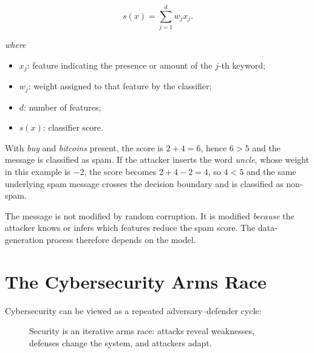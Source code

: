 \documentclass[11pt,a4paper]{report}
\newcommand{\wherelegend}{\par\smallskip\textit{where}\vspace{-0.3em}}
\begin{document}
\begin{equation}
 s(x)=\sum_{j=1}^{d} w_j x_j.
 \label{eq:spam-score}
\end{equation}
\wherelegend
\begin{itemize}
  \item $x_j$: feature indicating the presence or amount of the $j$-th keyword;
  \item $w_j$: weight assigned to that feature by the classifier;
  \item $d$: number of features;
  \item $s(x)$: classifier score.
\end{itemize}

With \emph{buy} and \emph{bitcoins} present, the score is $2+4=6$, hence $6>5$ and the message is classified as spam. If the attacker inserts the word \emph{uncle}, whose weight in this example is $-2$, the score becomes $2+4-2=4$, so $4<5$ and the same underlying spam message crosses the decision boundary and is classified as non-spam.

\begin{examplebox}[title={Adversarial adaptation}]
The message is not modified by random corruption. It is modified \emph{because} the attacker knows or infers which features reduce the spam score. The data-generation process therefore depends on the model.
\end{examplebox}

\section{The Cybersecurity Arms Race}

Cybersecurity can be viewed as a repeated adversary--defender cycle:

\begin{figure}[H]
\centering
{}
\caption{Security is an iterative arms race: attacks reveal weaknesses, defenses change the system, and attackers adapt.}
\label{fig:arms-race}
\end{figure}
\end{document}
